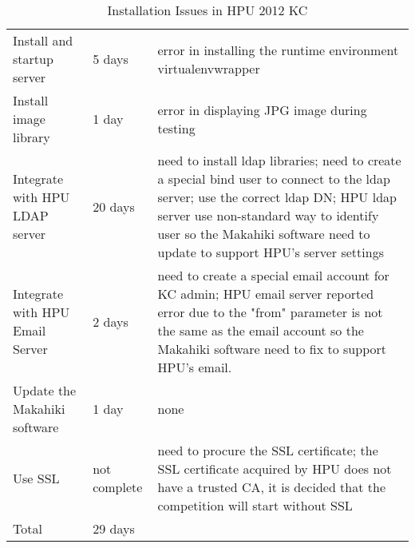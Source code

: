 \begin{table}[ht!]
  \centering
  \begin{tabular}{|P{0.28\columnwidth}|P{0.1\columnwidth}|p{0.5\columnwidth}|}
    \hline
      &
      &
      \\
    \hline
     Install and startup server & 5 days & error in installing the runtime environment virtualenvwrapper\\
    \hline
    Install image library & 1 day & error in displaying JPG image during testing \\
    \hline
     Integrate with HPU LDAP server &  20 days &  need to install ldap libraries; need to create a special bind user to connect to the ldap server; use the correct ldap DN; HPU ldap server use non-standard way to identify user so the Makahiki software need to update to support HPU's server settings \\
    \hline
    Integrate with HPU Email Server & 2 days & need to create a special email account for KC admin;  HPU email server reported error due to the "from" parameter is not the same as the email account so the Makahiki software need to fix to support HPU's email. \\
    \hline
    Update the Makahiki software & 1 day & none \\
    \hline
    Use SSL & not complete & need to procure the SSL certificate; the SSL certificate acquired by HPU does not have a trusted CA, it is decided that the competition will start without SSL \\
    \hline
    Total & 29 days & \\
    \hline
  \end{tabular}
  \caption{Installation Issues in HPU 2012 KC }
  \label{fig:makahiki-install-hpu2012}
\end{table}

